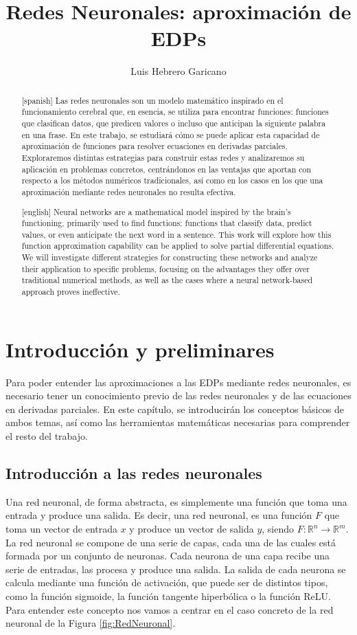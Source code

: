 \documentclass[a4paper,11pt,spanish, twoside, leqno]{tfg-uam}
\title{Redes Neuronales: aproximación de EDPs}
\author{Luis Hebrero Garicano}
\theoremstyle{definition}
\begin{document}
\begin{abstract}[spanish]
Las redes neuronales son un modelo matemático inspirado en el funcionamiento cerebral que, en esencia, se utiliza para encontrar funciones: funciones que clasifican datos, que predicen valores o incluso que anticipan la siguiente palabra en una frase. En este trabajo, se estudiará cómo se puede aplicar esta capacidad de aproximación de funciones para resolver ecuaciones en derivadas parciales. Exploraremos distintas estrategias para construir estas redes y analizaremos su aplicación en problemas concretos, centrándonos en las ventajas que aportan con respecto a los métodos numéricos tradicionales, así como en los casos en los que una aproximación mediante redes neuronales no resulta efectiva.
\end{abstract}
\begin{abstract}[english]
Neural networks are a mathematical model inspired by the brain's functioning, primarily used to find functions: functions that classify data, predict values, or even anticipate the next word in a sentence. This work will explore how this function approximation capability can be applied to solve partial differential equations. We will investigate different strategies for constructing these networks and analyze their application to specific problems, focusing on the advantages they offer over traditional numerical methods, as well as the cases where a neural network-based approach proves ineffective.
\end{abstract}
\mainmatter


\chapter{Introducción y preliminares}\label{chap1}
\setcounter{page}{1}
Para poder entender las aproximaciones a las EDPs mediante redes neuronales, es necesario tener un conocimiento previo de las redes neuronales y de las ecuaciones en derivadas parciales. En este capítulo, se introducirán los conceptos básicos de ambos temas, así como las herramientas matemáticas necesarias para comprender el resto del trabajo.

\section{Introducción a las redes neuronales}\label{sec:RedesNeuronales}
Una red neuronal, de forma abstracta, es simplemente una función que toma una entrada y produce una salida. Es decir, una red neuronal, es una función $F$ que toma un vector de entrada $x$ y produce un vector de salida $y$, siendo $F: \mathbb{R}^n \rightarrow \mathbb{R}^m$. La red neuronal se compone de una serie de capas, cada una de las cuales está formada por un conjunto de neuronas. Cada neurona de una capa recibe una serie de entradas, las procesa y produce una salida. La salida de cada neurona se calcula mediante una función de activación, que puede ser de distintos tipos, como la función sigmoide, la función tangente hiperbólica o la función ReLU. Para entender este concepto nos vamos a centrar en el caso concreto de la red neuronal de la Figura \ref{fig:RedNeuronal}.
\end{document}
